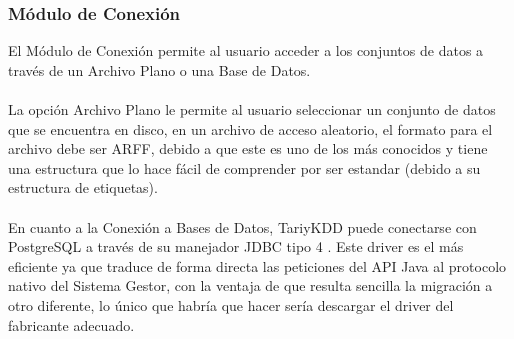 \subsubsection{M\'odulo de Conexi\'on}
El M\'odulo de Conexi\'on permite al usuario acceder a los conjuntos de datos a trav\'es de un Archivo Plano o
una Base de Datos.\\
\\
La opci\'on Archivo Plano le permite al usuario seleccionar un conjunto de datos que se encuentra en disco, en un
archivo de acceso aleatorio, el formato para el archivo debe ser ARFF\cite{arff}, debido a que este es uno de los
m\'as conocidos y tiene una estructura que lo hace f\'acil de comprender por ser estandar (debido a su estructura
de etiquetas).\\
\\
En cuanto a la Conexi\'on a Bases de Datos, TariyKDD puede conectarse con PostgreSQL a trav\'es de su manejador
JDBC tipo 4 \cite{abcjdbc}. Este driver es el m\'as eficiente ya que traduce de forma directa las peticiones del
API Java al protocolo nativo del Sistema Gestor, con la ventaja de que resulta sencilla la migraci\'on a otro
diferente, lo \'unico que habr\'ia que hacer ser\'ia descargar el driver del fabricante adecuado.


